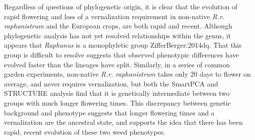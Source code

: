\documentclass[twocolumn]{bmcart}%
\begin{document}
Regardless of questions of phylogenetic origin, it is clear that the evolution of rapid flowering and loss of a vernalization requirement in non-native \textit{R.r. raphanistrum} and the European crops, are both rapid and recent. Although phylogenetic analysis has not yet resolved relationships within the genus, it appears that \textit{Raphanus} is a monophyletic group {ZifferBerger:2014dq}. That this group is difficult to resolve suggests that observed phenotypic differences have evolved faster than the lineages have split. Similarly, in a series of common garden experiments, non-native \textit{R.r. raphanistrum} takes only 20 days to flower on average, and never requires vernalization, but both the SmartPCA and STRUCTURE analysis find that it is genetically intermediate between two groups with much longer flowering times. This discrepancy between genetic background and phenotype suggests that longer flowering times and a vernalization are the ancestral state, and supports the idea that there has been rapid, recent evolution of these two weed phenotypes. 



\end{document}

